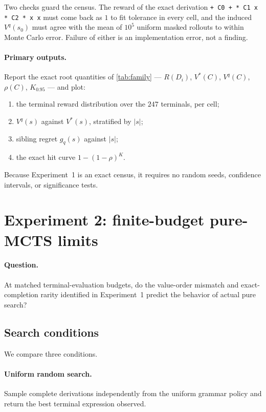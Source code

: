 \documentclass[11pt, a4paper]{article}
\theoremstyle{definition}
\begin{document}
Two checks guard the census.  The reward of the exact derivation
\texttt{+ C0 + * C1 x * C2 * x x} must come back as \(1\) to fit tolerance in
every cell, and the induced \(V^q(s_0)\) must agree with the mean of \(10^5\)
uniform masked rollouts to within Monte Carlo error.  Failure of either is an
implementation error, not a finding.

\paragraph{Primary outputs.}
Report the exact root quantities of \cref{tab:family} ---
\(R(D_i)\), \(V^*(C)\), \(V^q(C)\), \(\rho(C)\), \(K_{0.95}\) --- and plot:
\begin{enumerate}
    \item the terminal reward distribution over the \(247\) terminals, per cell;
    \item \(V^q(s)\) against \(V^*(s)\), stratified by \(\lvert s\rvert\);
    \item sibling regret \(g_q(s)\) against \(\lvert s\rvert\);
    \item the exact hit curve \(1-(1-\rho)^K\).
\end{enumerate}

Because Experiment~1 is an exact census, it requires no random seeds,
confidence intervals, or significance tests.

\section{Experiment 2: finite-budget pure-MCTS limits}
\label{sec:experiment-two}

\paragraph{Question.}
At matched terminal-evaluation budgets, do the value-order mismatch and
exact-completion rarity identified in Experiment~1 predict the behavior of
actual pure search?

\subsection{Search conditions}

We compare three conditions.

\paragraph{Uniform random search.}
Sample complete derivations independently from the uniform grammar policy and
return the best terminal expression observed.
\end{document}
